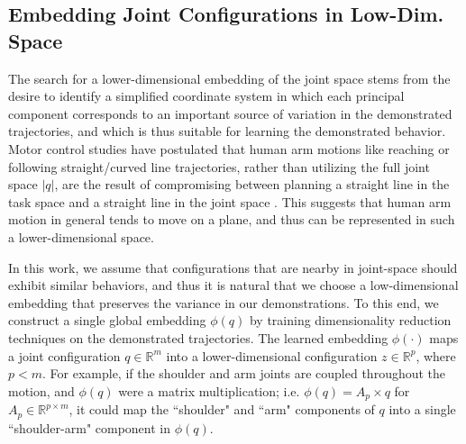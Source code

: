 \documentclass[letterpaper, 10 pt, conference,fleqn]{ieeeconf}
\begin{document}
\subsection{Embedding Joint Configurations in Low-Dim. Space}
The search for a lower-dimensional embedding of the joint space stems from the desire to identify a simplified coordinate system in which each principal component corresponds to an important source of variation in the demonstrated trajectories, and which is thus suitable for learning the demonstrated behavior. Motor control studies have postulated that human arm motions like reaching or following straight/curved line trajectories, rather than utilizing the full joint space $|q|$, are the result of compromising between planning a straight line in the task space and a straight line in the joint space \cite{Cruse1987humanarm,Okadome1999arm}. This suggests that human arm motion in general tends to move on a plane, and thus can be represented in such a lower-dimensional space. 

In this work, we assume that configurations that are nearby in joint-space should exhibit similar behaviors, and thus it is natural that we choose a low-dimensional embedding that preserves the variance in our demonstrations. To this end, we construct a single global embedding $\phi(q)$ by training dimensionality reduction techniques on the demonstrated trajectories. The learned embedding $\phi(\cdot)$ maps a joint configuration $q \in \mathbb{R}^m$ into a lower-dimensional configuration $z \in \mathbb{R}^p$, where $p < m$. For example, if the shoulder and arm joints are coupled throughout the motion, and $\phi(q)$ were a matrix multiplication; i.e. $\phi(q) = A_p\times q$ for $A_p \in \mathbb{R}^{p\times m}$, it could map the ``shoulder" and ``arm" components of $q$ into a single ``shoulder-arm" component in $\phi(q)$.
\end{document}

